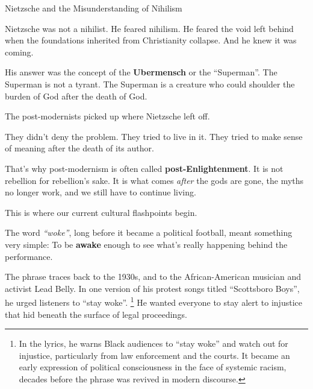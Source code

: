 \begin{HistoricalSidebar}{Nietzsche and the Misunderstanding of Nihilism}
  \medskip
  
  Nietzsche was not a nihilist.  
  He feared nihilism. He feared the void left behind when the foundations inherited from Christianity collapse.  
  And he knew it was coming.

  \medskip
  
  His answer was the concept of the \textbf{Ubermensch} or the ``Superman''. 
  The Superman is not a tyrant. 
  The Superman is a creature who could shoulder the burden of God after the death of God.

  \medskip
  
  The post-modernists picked up where Nietzsche left off.

  \medskip
  
  They didn’t deny the problem.  
  They tried to live in it. 
  They tried to make sense of meaning after the death of its author.

  \medskip
  
  That’s why post-modernism is often called \textbf{post-Enlightenment}.  
  It is not rebellion for rebellion’s sake.  
  It is what comes \textit{after} the gods are gone, the myths no longer work, and we still have to 
  continue living.
  
\end{HistoricalSidebar}

\medskip

This is where our current cultural flashpoints begin.

The word \textit{``woke''}, long before it became a political football, meant something very simple:  
To be \textbf{awake} enough to see what’s really happening behind the performance.

The phrase traces back to the 1930s, and to the African-American musician and activist Lead Belly.  
In one version of his protest songs titled ``Scottsboro Boys'',
he urged listeners to ``stay woke''. \footnote{In the lyrics, he warns Black audiences to “stay woke” and 
watch out for injustice, particularly from law enforcement and the courts. It became an early expression of 
political consciousness in the face of systemic racism, 
decades before the phrase was revived in modern discourse.}
He wanted everyone to stay alert to injustice that hid beneath the 
surface of legal proceedings.

\medskip

